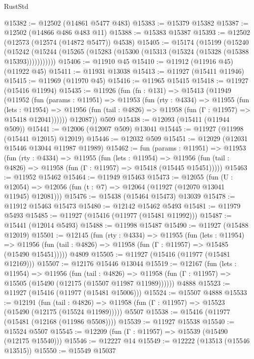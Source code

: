 \begin{lexlean}{RustStd}
\begin{coremodule}
@15382 := @12502 (@14861 @5477 @483)
@15383 := @15379 @15382
@15387 := @12502 (@14866 @486 @483 @11)
@15388 := @15383 @15387
@15393 := @12502 (@12573 (@12574 (@14872 @5477)) @4538)
@15405 := @15174
    (@15199
      (@15240
        (@15242 (@15244 (@15265 (@15283 (@15300 (@15313 (@15324 (@15328 (@15388 @15393)))))))))))
@15406 := @11910 @45
@15410 := @11912 (@11916 @45) (@11922 @45)
@15411 := @11931 @13038
@15413 := @11927 (@15411 @11946)
@15415 := @11969 (@11970 @45)
@15416 := @11965 @15415
@15418 := @11927 (@15416 @11994)
@15435 := @11926
    (fun (fn : @131) =>
    @15413
      (@11949
        (@11952
          (fun (params : @11951) =>
          @11953
            (fun (rty : @4334) =>
            @11955
              (fun (lets : @11954) =>
              @11956 (fun (tail : @4826) => @11958 (fun (Γ : @11957) => @15418 @12041))))))
        @12087))
    @509
@15438 := @12093 (@15411 (@11944 @509))
@15441 := @12006 (@12007 @509) @13041
@15445 := @11927 (@11998 (@15441 @12015) @12019)
@15446 := @12032 @509
@15451 := @12029 (@12031 @15446 @13044 @11987 @11989)
@15462 := fun (params : @11951) =>
  @11953
    (fun (rty : @4334) =>
    @11955
      (fun (lets : @11954) =>
      @11956 (fun (tail : @4826) => @11958 (fun (Γ : @11957) => @15418 (@15445 @15451)))))
@15463 := @11952 @15462
@15464 := @11949 @15463
@15473 := @12055
    (fun (U : @12054) => @12056 (fun (t : @7) => @12064 (@11927 (@12070 @13041 @11945) @12081)))
@15476 := @15438 (@15464 @15473) @13039
@15478 := @11912 @15463 @15473
@15480 := @12142 @15462 @5493
@15481 := @11979 @5493
@15485 := @11927 (@15416 (@11977 (@15481 @11992)))
@15487 := @15441 (@12014 @5493)
@15488 := @11998 @15487
@15490 := @11927 (@15488 @12019)
@15501 := @12145
    (fun (rty : @4334) =>
    @11955
      (fun (lets : @11954) =>
      @11956 (fun (tail : @4826) => @11958 (fun (Γ : @11957) => @15485 (@15490 @15451)))))
    @4809
@15505 := @11927 (@15416 (@11977 (@15481 @12169)))
@15507 := @12176 @15446 @13044
@15519 := @12167
    (fun (lets : @11954) =>
    @11956
      (fun (tail : @4826) =>
      @11958 (fun (Γ : @11957) => @15505 (@15490 (@12175 (@15507 @11987 @11989))))))
    @4888
@15523 := @11927 (@15416 (@11977 (@15481 @15006)))
@15524 := @15507 @4888
@15533 := @12191
    (fun (tail : @4826) => @11958 (fun (Γ : @11957) => @15523 (@15490 (@12175 (@15524 @11989)))))
    @5507
@15538 := @15416 (@11977 (@15481 (@12168 (@11986 @5508))))
@15539 := @11927 @15538
@15540 := @15524 @5507
@15545 := @12209 (fun (Γ : @11957) => @15539 (@15490 (@12175 @15540)))
@15546 := @12227 @14
@15549 := @12222 (@13513 (@15546 @13515))
@15550 := @15549 @15037

\end{coremodule}
\end{lexlean}
